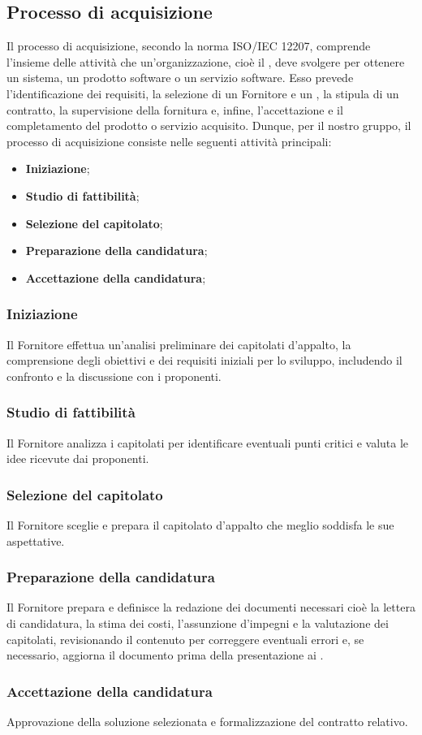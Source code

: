 \subsection{Processo di acquisizione}
\label{subsection:Processo_acquisizione}
Il processo di acquisizione, secondo la norma ISO/IEC 12207, comprende l'insieme delle attività che un'organizzazione, cioè il , deve svolgere per ottenere un sistema, un prodotto software o un servizio software. Esso prevede l'identificazione dei requisiti, la selezione di un Fornitore e un , la stipula di un contratto, la supervisione della fornitura e, infine, l'accettazione e il completamento del prodotto o servizio acquisito.
Dunque, per il nostro gruppo, il processo di acquisizione consiste nelle seguenti attività principali:

\begin{itemize}
    \item \textbf{Iniziazione}; 
    \item \textbf{Studio di fattibilità}; 
    \item \textbf{Selezione del capitolato}; 
    \item \textbf{Preparazione della candidatura}; 
    \item \textbf{Accettazione della candidatura}; 
\end{itemize}

\subsubsection{Iniziazione}
Il Fornitore effettua un'analisi preliminare dei capitolati d’appalto, la comprensione degli obiettivi e dei requisiti iniziali per lo sviluppo, includendo il confronto e la discussione con i proponenti.

\subsubsection{Studio di fattibilità}
Il Fornitore analizza i capitolati per identificare eventuali punti critici e valuta le idee ricevute dai proponenti.

\subsubsection{Selezione del capitolato}
Il Fornitore sceglie e prepara il capitolato d'appalto che meglio soddisfa le sue aspettative.

\subsubsection{Preparazione della candidatura}
Il Fornitore prepara e definisce la redazione dei documenti necessari cioè la lettera di candidatura, la stima dei costi, l'assunzione d’impegni e la valutazione dei capitolati, revisionando il contenuto per correggere eventuali errori e, se necessario, aggiorna il documento prima della presentazione ai .

\subsubsection{Accettazione della candidatura}
Approvazione della soluzione selezionata e formalizzazione del contratto relativo.